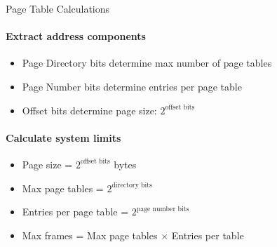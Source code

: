 \multend

\begin{KR}{Page Table Calculations}
    \paragraph{Extract address components}
    \begin{itemize}
        \item Page Directory bits determine max number of page tables
        \item Page Number bits determine entries per page table
        \item Offset bits determine page size: $2^{\text{offset bits}}$
    \end{itemize}
    
    \paragraph{Calculate system limits}
    \begin{itemize}
        \item Page size = $2^{\text{offset bits}}$ bytes
        \item Max page tables = $2^{\text{directory bits}}$
        \item Entries per page table = $2^{\text{page number bits}}$
        \item Max frames = Max page tables $\times$ Entries per table
    \end{itemize}
\end{KR}

